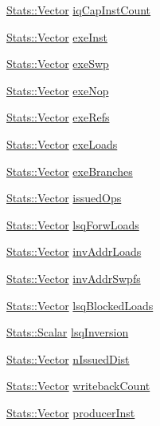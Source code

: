 \begin{DoxyCompactItemize}
\hyperlink{classStats_1_1Vector}{Stats::Vector} \hyperlink{classLWBackEnd_adf3ce08ee23edc6f4b6d1dcea1b39b31}{iqCapInstCount}
\item 
\hyperlink{classStats_1_1Vector}{Stats::Vector} \hyperlink{classLWBackEnd_a02103b42af4cd3d8b606764dcd24e277}{exeInst}
\item 
\hyperlink{classStats_1_1Vector}{Stats::Vector} \hyperlink{classLWBackEnd_a149e196f188dd6166c0c8c16cc023ad2}{exeSwp}
\item 
\hyperlink{classStats_1_1Vector}{Stats::Vector} \hyperlink{classLWBackEnd_acada805051a7dbb6b8459c5856be8a01}{exeNop}
\item 
\hyperlink{classStats_1_1Vector}{Stats::Vector} \hyperlink{classLWBackEnd_aad83ba41ef04d5d18ea21b492e5b2313}{exeRefs}
\item 
\hyperlink{classStats_1_1Vector}{Stats::Vector} \hyperlink{classLWBackEnd_acdffd7467b37177b4352cc95a4541c7d}{exeLoads}
\item 
\hyperlink{classStats_1_1Vector}{Stats::Vector} \hyperlink{classLWBackEnd_a1c8de90750d60821aba6ab2e07c3564c}{exeBranches}
\item 
\hyperlink{classStats_1_1Vector}{Stats::Vector} \hyperlink{classLWBackEnd_ace641e242f8066857ee021c0f54488fc}{issuedOps}
\item 
\hyperlink{classStats_1_1Vector}{Stats::Vector} \hyperlink{classLWBackEnd_a8360980798f5ee19e9b6a40c1d2402dd}{lsqForwLoads}
\item 
\hyperlink{classStats_1_1Vector}{Stats::Vector} \hyperlink{classLWBackEnd_ab6f202cc22f2199e7d5cafb2e5af3451}{invAddrLoads}
\item 
\hyperlink{classStats_1_1Vector}{Stats::Vector} \hyperlink{classLWBackEnd_a188a7b143a76b88b85fb994dbdd7e0ea}{invAddrSwpfs}
\item 
\hyperlink{classStats_1_1Vector}{Stats::Vector} \hyperlink{classLWBackEnd_a4b6441df3c51e29c627f7dbf5bed8409}{lsqBlockedLoads}
\item 
\hyperlink{classStats_1_1Scalar}{Stats::Scalar} \hyperlink{classLWBackEnd_abf96f4acba126fbcf919829a1125954c}{lsqInversion}
\item 
\hyperlink{classStats_1_1Vector}{Stats::Vector} \hyperlink{classLWBackEnd_a63ce9344b46599ab3db4eb196ee89799}{nIssuedDist}
\item 
\hyperlink{classStats_1_1Vector}{Stats::Vector} \hyperlink{classLWBackEnd_a85f5041a2e3375a2dc81bc0ae534aa2e}{writebackCount}
\item 
\hyperlink{classStats_1_1Vector}{Stats::Vector} \hyperlink{classLWBackEnd_a79df9c76c4c8c7da92694a4a571d44f0}{producerInst}

\end{DoxyCompactItemize}
